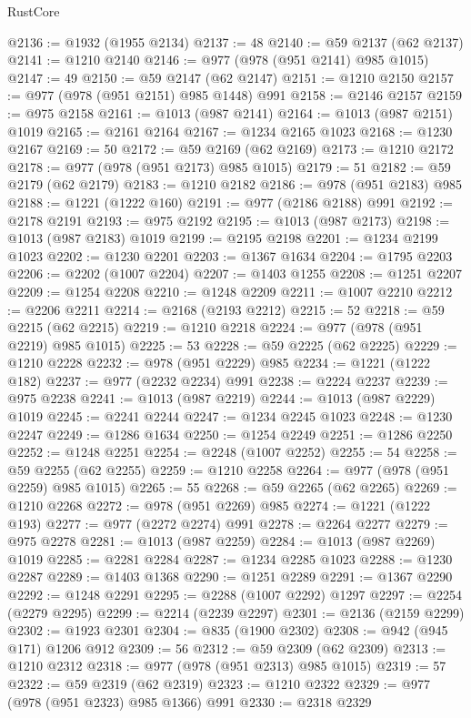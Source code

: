 \begin{lexlean}{RustCore}
\begin{coremodule}
@2136 := @1932 (@1955 @2134)
@2137 := 48
@2140 := @59 @2137 (@62 @2137)
@2141 := @1210 @2140
@2146 := @977 (@978 (@951 @2141) @985 @1015)
@2147 := 49
@2150 := @59 @2147 (@62 @2147)
@2151 := @1210 @2150
@2157 := @977 (@978 (@951 @2151) @985 @1448) @991
@2158 := @2146 @2157
@2159 := @975 @2158
@2161 := @1013 (@987 @2141)
@2164 := @1013 (@987 @2151) @1019
@2165 := @2161 @2164
@2167 := @1234 @2165 @1023
@2168 := @1230 @2167
@2169 := 50
@2172 := @59 @2169 (@62 @2169)
@2173 := @1210 @2172
@2178 := @977 (@978 (@951 @2173) @985 @1015)
@2179 := 51
@2182 := @59 @2179 (@62 @2179)
@2183 := @1210 @2182
@2186 := @978 (@951 @2183) @985
@2188 := @1221 (@1222 @160)
@2191 := @977 (@2186 @2188) @991
@2192 := @2178 @2191
@2193 := @975 @2192
@2195 := @1013 (@987 @2173)
@2198 := @1013 (@987 @2183) @1019
@2199 := @2195 @2198
@2201 := @1234 @2199 @1023
@2202 := @1230 @2201
@2203 := @1367 @1634
@2204 := @1795 @2203
@2206 := @2202 (@1007 @2204)
@2207 := @1403 @1255
@2208 := @1251 @2207
@2209 := @1254 @2208
@2210 := @1248 @2209
@2211 := @1007 @2210
@2212 := @2206 @2211
@2214 := @2168 (@2193 @2212)
@2215 := 52
@2218 := @59 @2215 (@62 @2215)
@2219 := @1210 @2218
@2224 := @977 (@978 (@951 @2219) @985 @1015)
@2225 := 53
@2228 := @59 @2225 (@62 @2225)
@2229 := @1210 @2228
@2232 := @978 (@951 @2229) @985
@2234 := @1221 (@1222 @182)
@2237 := @977 (@2232 @2234) @991
@2238 := @2224 @2237
@2239 := @975 @2238
@2241 := @1013 (@987 @2219)
@2244 := @1013 (@987 @2229) @1019
@2245 := @2241 @2244
@2247 := @1234 @2245 @1023
@2248 := @1230 @2247
@2249 := @1286 @1634
@2250 := @1254 @2249
@2251 := @1286 @2250
@2252 := @1248 @2251
@2254 := @2248 (@1007 @2252)
@2255 := 54
@2258 := @59 @2255 (@62 @2255)
@2259 := @1210 @2258
@2264 := @977 (@978 (@951 @2259) @985 @1015)
@2265 := 55
@2268 := @59 @2265 (@62 @2265)
@2269 := @1210 @2268
@2272 := @978 (@951 @2269) @985
@2274 := @1221 (@1222 @193)
@2277 := @977 (@2272 @2274) @991
@2278 := @2264 @2277
@2279 := @975 @2278
@2281 := @1013 (@987 @2259)
@2284 := @1013 (@987 @2269) @1019
@2285 := @2281 @2284
@2287 := @1234 @2285 @1023
@2288 := @1230 @2287
@2289 := @1403 @1368
@2290 := @1251 @2289
@2291 := @1367 @2290
@2292 := @1248 @2291
@2295 := @2288 (@1007 @2292) @1297
@2297 := @2254 (@2279 @2295)
@2299 := @2214 (@2239 @2297)
@2301 := @2136 (@2159 @2299)
@2302 := @1923 @2301
@2304 := @835 (@1900 @2302)
@2308 := @942 (@945 @171) @1206 @912
@2309 := 56
@2312 := @59 @2309 (@62 @2309)
@2313 := @1210 @2312
@2318 := @977 (@978 (@951 @2313) @985 @1015)
@2319 := 57
@2322 := @59 @2319 (@62 @2319)
@2323 := @1210 @2322
@2329 := @977 (@978 (@951 @2323) @985 @1366) @991
@2330 := @2318 @2329

\end{coremodule}
\end{lexlean}

